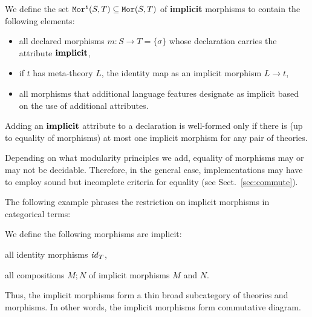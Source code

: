 \begin{definition}
We define the set $\mathtt{Mor^i}(S,T)\subseteq\mathtt{Mor}(S,T)$ of \textbf{implicit} morphisms to contain the following elements:
\begin{itemize}
 \item all declared morphisms $m:S\to T=\{\sigma\}$ whose declaration carries the attribute $\operatorname{\mathbf{implicit}}$,
 \item if $t$ has meta-theory $L$, the identity map as an implicit morphism $L\to t$,
 \item all morphisms that additional language features designate as implicit based on the use of additional attributes.
\end{itemize}

Adding an $\operatorname{\mathbf{implicit}}$ attribute to a declaration is well-formed only if there is (up to equality of morphisms) at most one implicit morphism for any pair of theories.
\end{definition}

\begin{modexp}
Depending on what modularity principles we add, equality of morphisms may or may not be decidable.
Therefore, in the general case, implementations may have to employ sound but incomplete criteria for equality (see Sect.~\ref{sec:commute}).
\end{modexp}

\begin{modexp}
The following example phrases the restriction on implicit morphisms in categorical terms:
\begin{example}\label{impl:cat}
We define the following morphisms are implicit:
\begin{compactitem}
 \item all identity morphisms $\mathit{id}_{T}$,
 \item all compositions $M;N$ of implicit morphisms $M$ and $N$.
\end{compactitem}
Thus, the implicit morphisms form a thin broad subcategory of theories and morphisms.
In other words, the implicit morphisms form commutative diagram.
\end{example}
\end{modexp}

